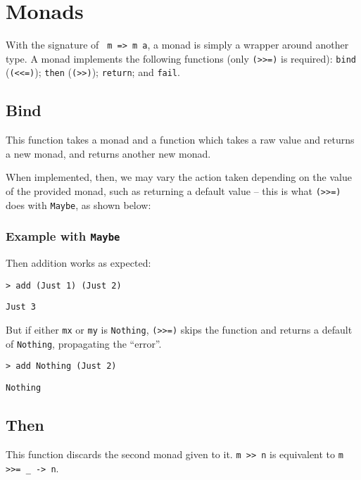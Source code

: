 \section{Monads}
With the signature of \texttt{ m => m a}, a monad is simply a wrapper around another type. A monad implements the following functions (only \texttt{(>>=)} is required): \texttt{bind} (\texttt{(<<=)}); \texttt{then} (\texttt{(>>)}); \texttt{return}; and \texttt{fail}.

\subsection{Bind}
This function takes a monad and a function which takes a raw value and returns a new monad, and returns another new monad.

When implemented, then, we may vary the action taken depending on the value of the provided monad, such as returning a default value -- this is what \texttt{(>>=)} does with \texttt{Maybe}, as shown below: 

\subsubsection{Example with \texttt{Maybe}}

Then addition works as expected:

\texttt{> add (Just 1) (Just 2)}

\texttt{Just 3}

But if either \texttt{mx} or \texttt{my} is \texttt{Nothing}, \texttt{(>>=)} skips the function and returns a default of \texttt{Nothing}, propagating the ``error''.

\texttt{> add Nothing (Just 2)}

\texttt{Nothing}

\subsection{Then}

This function discards the second monad given to it. \texttt{m >> n} is equivalent to \texttt{m >>= \_ -> n}.

